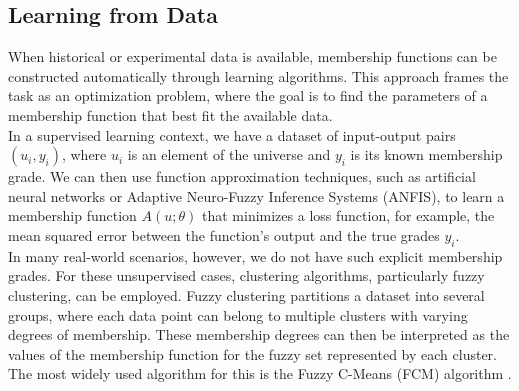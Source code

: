
\subsection{Learning from Data}
When historical or experimental data is available, membership functions can be constructed automatically through learning algorithms. This approach frames the task as an optimization problem, where the goal is to find the parameters of a membership function that best fit the available data.\\

In a supervised learning context, we have a dataset of input-output pairs $(u_i, y_i)$, where $u_i$ is an element of the universe and $y_i$ is its known membership grade. We can then use function approximation techniques, such as artificial neural networks or Adaptive Neuro-Fuzzy Inference Systems (ANFIS), to learn a membership function $A(u; \theta)$ that minimizes a loss function, for example, the mean squared error between the function's output and the true grades $y_i$.\\

In many real-world scenarios, however, we do not have such explicit membership grades. For these unsupervised cases, clustering algorithms, particularly fuzzy clustering, can be employed. Fuzzy clustering partitions a dataset into several groups, where each data point can belong to multiple clusters with varying degrees of membership. These membership degrees can then be interpreted as the values of the membership function for the fuzzy set represented by each cluster. The most widely used algorithm for this is the Fuzzy C-Means (FCM) algorithm \cite{bezdek1981pattern}.\\


